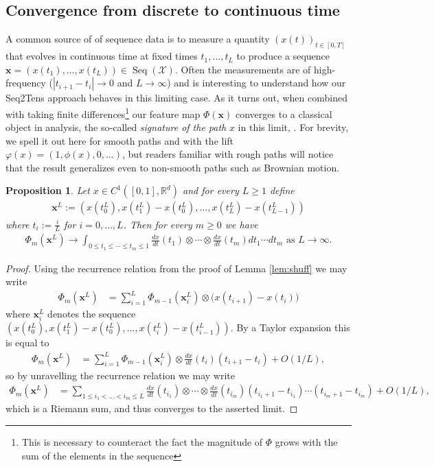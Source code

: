 \documentclass{article} \usepackage{iclr2021_conference,times}
\newcommand{\R}{\mathbb{R}}
\newcommand{\bx}{\mathbf{x}}
\newcommand{\cX}{\mathcal{X}}
\newcommand{\Seq}[1]{\operatorname{Seq}(#1)}
\theoremstyle{plain}
\newtheorem{proposition}[thm]{Proposition}
\theoremstyle{definition}
\begin{document}
\subsection{Convergence from discrete to continuous time}\label{sec:convergence to sig}	
A common source of of sequence data is to measure a quantity $(x(t))_{t \in [0,T]}$ that evolves in continuous time at fixed times $t_1,\ldots,t_L$ to produce a sequence $\bx=(x(t_1),\ldots,x(t_L))  \in \Seq{\cX}$.
Often the measurements are of high-frequency ($|t_{i+1}-t_i| \to 0$ and $L \to \infty$) and is interesting to understand how our Seq2Tens approach behaves in this limiting case.
As it turns out, when combined with taking finite differences\footnote{This is necessary to counteract the fact the magnitude of $ \Phi $ grows with the sum of the elements in the sequence} our feature map $\Phi(\bx)$ converges to a classical object in analysis, the so-called \emph{signature of the path} $x$ in this limit, \citep{primer2016} .
For brevity, we spell it out here for smooth paths and with the lift $ \varphi(x) = (1, \phi(x), 0, \ldots) $, but readers familiar with rough paths will notice that the result generalizes even to non-smooth paths such as Brownian motion.
\begin{proposition}\label{prop:convergence to signature}
  Let $x \in C^1([0,1],\R^d)$ and for every $L \ge 1$ define 
  \begin{align}
  \bx^L:=(x(t_0^L), x(t_1^L) - x(t_0^L), \ldots, x(t_L^L)-x(t_{L-1}^L))
  \end{align}
  where $t_i:= \frac{i}{L}$ for $i=0,\ldots,L$.
  Then for every $m \ge 0$ we have
  \begin{align}
    \Phi_m(\bx^L) \to \int_{0 \le t_1 \le \cdots \le t_m \le 1} \frac{dx}{dt}(t_1) \otimes \cdots \otimes \frac{dx}{dt}(t_m) dt_1 \cdots d t_m  \text{ as } L \to \infty. 
  \end{align}
\end{proposition}
\begin{proof}
  Using the recurrence relation from the proof of Lemma \ref{lem:shuff} we may write
\begin{align}
\Phi_m(\bx^L) &= \sum_{i=1}^L \Phi_{m-1}(\bx_i^L) \otimes \big(x(t_{i+1}) - x(t_i)\big) 
\end{align}
where $ \bx_i^L $ denotes the sequence $ (x(t_0^L), x(t_1^L) - x(t_0^L), \ldots, x(t_i^L)-x(t_{i-1}^L)) $. By a Taylor expansion this is equal to
\begin{align}
\Phi_m(\bx^L) &= \sum_{i=1}^L \Phi_{m-1}(\bx_i^L) \otimes \frac{dx}{dt}(t_i) (t_{i+1} - t_i) + O(1/L),
\end{align}
so by unravelling the recurrence relation we may write
\begin{align}
\Phi_m(\bx^L) &= \sum_{1 \leq i_1 < \ldots < i_m \leq L} \frac{dx}{dt}(t_{i_1}) \otimes \cdots \otimes \frac{dx}{dt}(t_{i_m}) (t_{{i_1}+1} - t_{i_1})\cdots(t_{{i_m}+1} - t_{i_m}) + O(1/L),
\end{align}
which is a Riemann sum, and thus converges to the asserted limit.
\end{proof}
\end{document}
